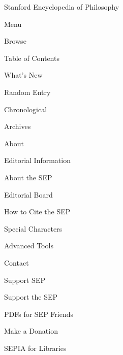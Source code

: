 \documentclass[]{article}
\author{}
\date{\vspace{-2.5em}}
\begin{document}
\hypertarget{header-wrapper}{}
\hypertarget{header}{}
\hypertarget{branding}{}
\leavevmode\hypertarget{site-logo}{}%

\leavevmode\hypertarget{site-title}{}%
Stanford Encyclopedia of Philosophy

\hypertarget{navigation}{}
\begin{navbar}

\begin{navbar-inner}

\begin{container}

 Menu

\begin{nav-collapse}

 Browse

Table of Contents

What's New

Random Entry

Chronological

Archives

 About

Editorial Information

About the SEP

Editorial Board

How to Cite the SEP

Special Characters

Advanced Tools

Contact

 Support SEP

Support the SEP

PDFs for SEP Friends

Make a Donation

SEPIA for Libraries

\end{nav-collapse}

\end{container}

\end{navbar-inner}

\end{navbar}

\hypertarget{search}{}
\begin{search-btn-wrapper}

\end{search-btn-wrapper}
\end{document}
